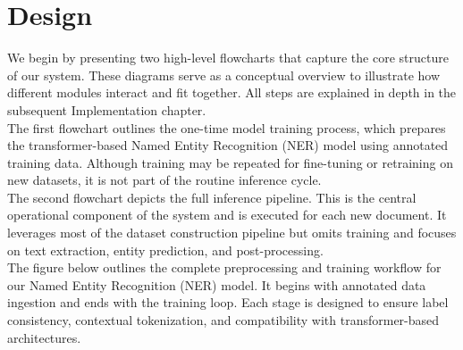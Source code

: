 \documentclass{article}
\begin{document}
\section{Design}

We begin by presenting two high-level flowcharts that capture the core structure of our system. These diagrams serve as a conceptual overview to illustrate how different modules interact and fit together. All steps are explained in depth in the subsequent Implementation chapter. \\

The first flowchart outlines the one-time model training process, which prepares the transformer-based Named Entity Recognition (NER) model using annotated training data. Although training may be repeated for fine-tuning or retraining on new datasets, it is not part of the routine inference cycle. \\

The second flowchart depicts the full inference pipeline. This is the central operational component of the system and is executed for each new document. It leverages most of the dataset construction pipeline but omits training and focuses on text extraction, entity prediction, and post-processing. \\


The figure below outlines the complete preprocessing and training workflow for our Named Entity Recognition (NER) model. It begins with annotated data ingestion and ends with the training loop. Each stage is designed to ensure label consistency, contextual tokenization, and compatibility with transformer-based architectures.
\end{document}
